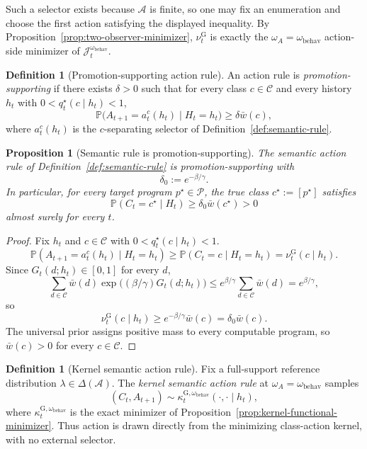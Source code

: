 \documentclass[11pt]{article}
\newtheorem{proposition}[theorem]{Proposition}
\theoremstyle{definition}
\newtheorem{definition}[theorem]{Definition}
\theoremstyle{remark}
\newcommand{\Acal}{\mathcal{A}}
\newcommand{\Ccal}{\mathcal{C}}
\newcommand{\Pcal}{\mathcal{P}}
\newcommand{\Prob}{\mathbb{P}}
\begin{document}
Such a selector exists because $\Acal$ is finite, so one may fix an enumeration and choose the first action satisfying the displayed inequality. By Proposition~\ref{prop:two-observer-minimizer}, $\nu_t^{\mathrm G}$ is exactly the $\omega_A=\omega_{\mathrm{behav}}$ action-side minimizer of $\mathcal J_t^{\omega_{\mathrm{behav}}}$.

\begin{definition}[Promotion-supporting action rule]
\label{def:promotion-supporting}
An action rule is \emph{promotion-supporting} if there exists $\delta>0$ such that for every class $c\in\Ccal$ and every history $h_t$ with $0<q_t^\star(c\mid h_t)<1$,
\[
\Prob\bigl(A_{t+1}=a_t^c(h_t)\mid H_t=h_t\bigr)\ge \delta\bar w(c),
\]
where $a_t^c(h_t)$ is the $c$-separating selector of Definition~\ref{def:semantic-rule}.
\end{definition}

\begin{proposition}[Semantic rule is promotion-supporting]
\label{prop:semantic-is-promotion-supporting}
The semantic action rule of Definition~\ref{def:semantic-rule} is promotion-supporting with
\[
\delta_0:=e^{-\beta/\gamma}.
\]
In particular, for every target program $p^\star\in\Pcal$, the true class $c^\star:=[p^\star]$ satisfies
\[
\Prob(C_t=c^\star\mid H_t)\ge\delta_0\bar w(c^\star)>0
\]
almost surely for every $t$.
\end{proposition}

\begin{proof}
Fix $h_t$ and $c\in\Ccal$ with $0<q_t^\star(c\mid h_t)<1$.
\[
\Prob(A_{t+1}=a_t^c(h_t)\mid H_t=h_t)\ge\Prob(C_t=c\mid H_t=h_t)=\nu_t^{\mathrm G}(c\mid h_t).
\]
Since $G_t(d;h_t)\in[0,1]$ for every $d$,
\[
\sum_{d\in\Ccal}\bar w(d)\exp\!\bigl((\beta/\gamma)G_t(d;h_t)\bigr)\le e^{\beta/\gamma}\sum_{d\in\Ccal}\bar w(d)=e^{\beta/\gamma},
\]
so
\[
\nu_t^{\mathrm G}(c\mid h_t)\ge e^{-\beta/\gamma}\bar w(c)=\delta_0\bar w(c).
\]
The universal prior assigns positive mass to every computable program, so $\bar w(c)>0$ for every $c\in\Ccal$.
\end{proof}

\begin{definition}[Kernel semantic action rule]
\label{def:kernel-semantic-rule}
Fix a full-support reference distribution $\lambda\in\Delta(\Acal)$. The \emph{kernel semantic action rule} at $\omega_A=\omega_{\mathrm{behav}}$ samples
\[
(C_t,A_{t+1})\sim \kappa_t^{\mathrm G,\omega_{\mathrm{behav}}}(\cdot,\cdot\mid h_t),
\]
where $\kappa_t^{\mathrm G,\omega_{\mathrm{behav}}}$ is the exact minimizer of Proposition~\ref{prop:kernel-functional-minimizer}. Thus action is drawn directly from the minimizing class-action kernel, with no external selector.
\end{definition}
\end{document}
